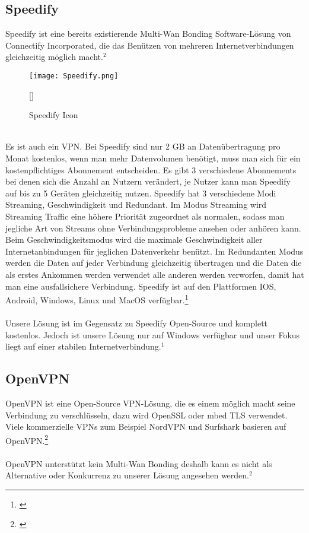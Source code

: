 \subsection{Speedify}
Speedify ist eine bereits existierende Multi-Wan Bonding Software-Lösung von Connectify Incorporated, die das Benützen von mehreren Internetverbindungen gleichzeitig möglich macht.$^{2}$
\begin{figure}[H]
    \centering
    \texttt{[image: Speedify.png]}
    \caption[Speedify]{Speedify Icon}[\cite{3}] 
\end{figure}
\newpage
\ \\
Es ist auch ein VPN. Bei Speedify sind nur 2 GB an Datenübertragung pro Monat kostenlos, wenn man mehr Datenvolumen benötigt, muss man sich für ein kostenpflichtiges Abonnement entscheiden. Es gibt 3 verschiedene Abonnements bei denen sich die Anzahl an Nutzern verändert, je Nutzer kann man Speedify auf bis zu 5 Geräten gleichzeitig nutzen. Speedify hat 3 verschiedene Modi Streaming, Geschwindigkeit und Redundant. Im Modus Streaming wird Streaming Traffic eine höhere Priorität zugeordnet als normalen, sodass man jegliche Art von Streams ohne Verbindungsprobleme ansehen oder anhören kann. Beim Geschwindigkeitsmodus wird die maximale Geschwindigkeit aller Internetanbindungen für jeglichen Datenverkehr benützt. Im Redundanten Modus werden die Daten auf jeder Verbindung gleichzeitig übertragen und die Daten die als erstes Ankommen werden verwendet alle anderen werden verworfen, damit hat man eine ausfallsichere Verbindung. Speedify ist auf den Plattformen IOS, Android, Windows, Linux und MacOS verfügbar.\footnote[1]{\cite[Vgl.][]{3}}
\\\\
Unsere Lösung ist im Gegensatz zu Speedify Open-Source und komplett kostenlos. Jedoch ist unsere Lösung nur auf Windows verfügbar und unser Fokus liegt auf einer stabilen Internetverbindung.$^{1}$

\subsection{OpenVPN}
OpenVPN ist eine Open-Source VPN-Lösung, die es einem möglich macht seine Verbindung zu verschlüsseln, dazu wird OpenSSL oder mbed TLS verwendet. Viele kommerzielle VPNs zum Beispiel NordVPN und Surfshark basieren auf OpenVPN.\footnote[2]{\cite[Vgl.][]{4}}
\\\\
OpenVPN unterstützt kein Multi-Wan Bonding deshalb kann es nicht als Alternative oder Konkurrenz zu unserer Lösung angesehen werden.$^{2}$
